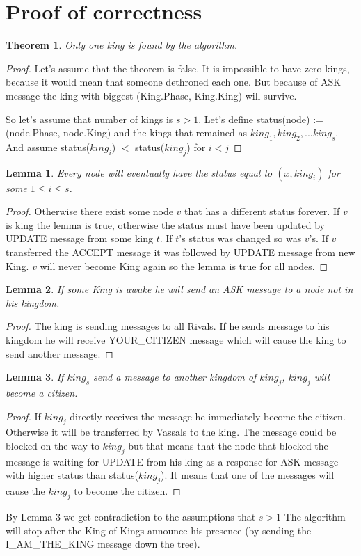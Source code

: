 \documentclass{article}
\newtheorem{lemma}{Lemma}
\newtheorem{theorem}{Theorem}
\begin{document}
\section*{Proof of correctness}
\begin{theorem}
Only one king is found by the algorithm.
\end{theorem}
\begin{proof}
Let's assume that the theorem is false. It is impossible to have zero kings, because it would mean that someone dethroned each one. But because of ASK message the king with biggest (King.Phase, King.King) will survive.

So let's assume that number of kings is \(s > 1\). Let's define status(node) := (node.Phase, node.King) and the kings that remained as \(king_1, king_2, ... king_s\). And assume status(\(king_i\)) \(<\) status(\(king_j\)) for \(i < j\)
\end{proof}
\begin{lemma}
Every node will eventually have the status equal to \((x, king_i)\) for some \(1 \leq i \leq s\).
\end{lemma}
\begin{proof}
Otherwise there exist some node \(v\) that has a different status forever. If \(v\) is king the lemma is true, otherwise the status must have been updated by UPDATE message from some king \(t\). If \(t\)'s status was changed so was \(v\)'s. If \(v\) transferred the ACCEPT message it was followed by UPDATE message from new King. \(v\) will never become King again so the lemma is true for all nodes.
\end{proof}
\begin{lemma}
If some King is awake he will send an ASK message to a node not in his kingdom.
\end{lemma}
\begin{proof}
The king is sending messages to all Rivals. If he sends message to his kingdom he will receive YOUR\_CITIZEN message which will cause the king to send another message.
\end{proof}
\begin{lemma}
If \(king_s\) send a message to another kingdom of \(king_j\), \(king_j\) will become a citizen. 
\end{lemma}
\begin{proof}
If \(king_j\) directly receives the message he immediately become the citizen. Otherwise it will be transferred by Vassals to the king. The message could be blocked on the way to \(king_j\) but that means that the node that blocked the message is waiting for UPDATE from his king as a response for ASK message with higher status than status(\(king_j\)). It means that one of the messages will cause the 
\(king_j\) to become the citizen.
\end{proof}
By Lemma 3 we get contradiction to the assumptions that \(s > 1\)
The algorithm will stop after the King of Kings announce his presence (by sending the I\_AM\_THE\_KING message down the tree).
\end{document}
